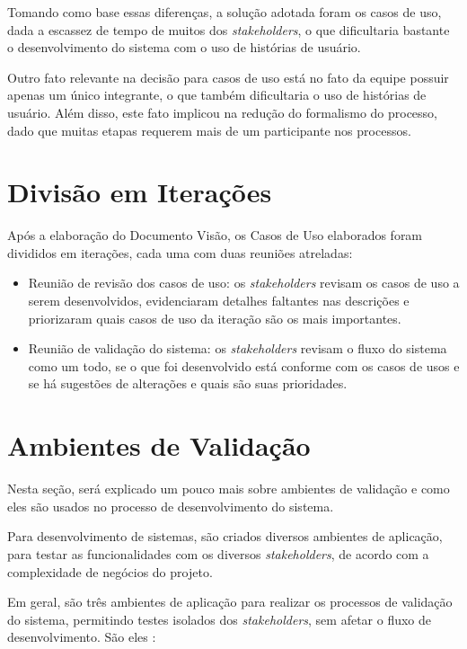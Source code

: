 Tomando como base essas diferenças, a solução adotada foram os casos de uso, dada a escassez de tempo de muitos dos \textit{stakeholders}, o que dificultaria bastante o desenvolvimento do sistema com o uso de histórias de usuário.

Outro fato relevante na decisão para casos de uso está no fato da equipe possuir apenas um único integrante, o que também dificultaria o uso de histórias de usuário. Além disso, este fato implicou na redução do formalismo do processo, dado que muitas etapas requerem mais de um participante nos processos.

\section{Divisão em Iterações}
Após a elaboração do Documento Visão, os Casos de Uso elaborados foram divididos em iterações, cada uma com duas reuniões atreladas:

\begin{itemize}
    \item Reunião de revisão dos casos de uso: os \textit{stakeholders} revisam os casos de uso a serem desenvolvidos, evidenciaram detalhes faltantes nas descrições e priorizaram quais casos de uso da iteração são os mais importantes.
    \item Reunião de validação do sistema: os \textit{stakeholders} revisam o fluxo do sistema como um todo, se o que foi desenvolvido está conforme com os casos de usos e se há sugestões de alterações e quais são suas prioridades.
\end{itemize}

\section{Ambientes de Validação}
Nesta seção, será explicado um pouco mais sobre ambientes de validação e como eles são usados no processo de desenvolvimento do sistema.

Para desenvolvimento de sistemas, são criados diversos ambientes de aplicação, para testar as funcionalidades com os diversos \textit{stakeholders}, de acordo com a complexidade de negócios do projeto.

Em geral, são três ambientes de aplicação para realizar os processos de validação do sistema, permitindo testes isolados dos \textit{stakeholders}, sem afetar o fluxo de desenvolvimento. São eles \cite{tracyragan2017}:

